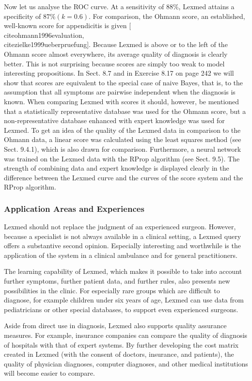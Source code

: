 \documentclass[10pt]{book}
\begin{document}
Now let us analyse the ROC curve. At a sensitivity of $88 \%$, Lexmed attains a specificity of $87 \%(k=0.6)$. For comparison, the Ohmann score, an established, well-known score for appendicitis is given [\\cite{ohmann1996evaluation}, \\cite{zielke1999ueberpruefung}]. Because Lexmed is above or to the left of the Ohmann score almost everywhere, its average quality of diagnosis is clearly better. This is not surprising because scores are simply too weak to model interesting propositions. In Sect. 8.7 and in Exercise 8.17 on page 242 we will show that scores are equivalent to the special case of naive Bayes, that is, to the assumption that all symptoms are pairwise independent when the diagnosis is known. When comparing Lexmed with scores it should, however, be mentioned that a statistically representative database was used for the Ohmann score, but a non-representative database enhanced with expert knowledge was used for Lexmed. To get an idea of the quality of the Lexmed data in comparison to the Ohmann data, a linear score was calculated using the least squares method (see Sect. 9.4.1), which is also drawn for comparison. Furthermore, a neural network was trained on the Lexmed data with the RProp algorithm (see Sect. 9.5). The strength of combining data and expert knowledge is displayed clearly in the difference between the Lexmed curve and the curves of the score system and the RProp algorithm.

\subsubsection*{Application Areas and Experiences}
Lexmed should not replace the judgment of an experienced surgeon. However, because a specialist is not always available in a clinical setting, a Lexmed query offers a substantive second opinion. Especially interesting and worthwhile is the application of the system in a clinical ambulance and for general practitioners.

The learning capability of Lexmed, which makes it possible to take into account further symptoms, further patient data, and further rules, also presents new possibilities in the clinic. For especially rare groups which are difficult to diagnose, for example children under six years of age, Lexmed can use data from pediatricians or other special databases, to support even experienced surgeons.

Aside from direct use in diagnosis, Lexmed also supports quality assurance measures. For example, insurance companies can compare the quality of diagnosis of hospitals with that of expert systems. By further developing the cost matrix created in Lexmed (with the consent of doctors, insurance, and patients), the quality of physician diagnoses, computer diagnoses, and other medical institutions will become easier to compare.
\end{document}
